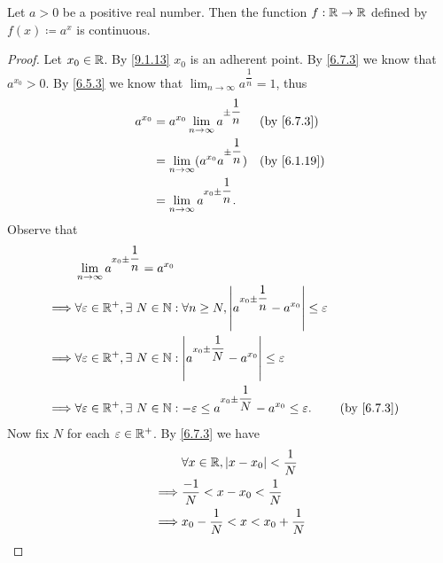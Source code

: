 \begin{prop}\label{9.4.10}
  Let \(a > 0\) be a positive real number.
  Then the function \(f : \mathbb{R} \to \mathbb{R}\) defined by \(f(x) \coloneqq a^x\) is continuous.
\end{prop}

\begin{proof}
  Let \(x_0 \in \mathbb{R}\).
  By \cref{9.1.13} \(x_0\) is an adherent point.
  By \cref{6.7.3} we know that \(a^{x_0} > 0\).
  By \cref{6.5.3} we know that \(\lim_{n \to \infty} a^{\dfrac{1}{n}} = 1\), thus
  \begin{align*}
    a^{x_0} & = a^{x_0} \lim_{n \to \infty} a^{\pm \dfrac{1}{n}}   &  & \text{(by \cref{6.7.3})}  \\
            & = \lim_{n \to \infty} (a^{x_0} a^{\pm \dfrac{1}{n}}) &  & \text{(by \cref{6.1.19})} \\
            & = \lim_{n \to \infty} a^{x_0 \pm \dfrac{1}{n}}.
  \end{align*}
  Observe that
  \begin{align*}
             & \lim_{n \to \infty} a^{x_0 \pm \dfrac{1}{n}} = a^{x_0}                                                                                                      \\
    \implies & \forall \varepsilon \in \R^+, \exists\ N \in \N : \forall n \geq N, \abs{a^{x_0 \pm \dfrac{1}{n}} - a^{x_0}} \leq \varepsilon                               \\
    \implies & \forall \varepsilon \in \R^+, \exists\ N \in \N : \abs{a^{x_0 \pm \dfrac{1}{N}} - a^{x_0}} \leq \varepsilon                                                 \\
    \implies & \forall \varepsilon \in \R^+, \exists\ N \in \N : -\varepsilon \leq a^{x_0 \pm \dfrac{1}{N}} - a^{x_0} \leq \varepsilon.      &  & \text{(by \cref{6.7.3})}
  \end{align*}
  Now fix \(N\) for each \(\varepsilon \in \mathbb{R}^+\).
  By \cref{6.7.3} we have
  \begin{align*}
             & \forall x \in \R, \abs{x - x_0} < \dfrac{1}{N}                                                                                                             \\
    \implies & \dfrac{-1}{N} < x - x_0 < \dfrac{1}{N}                                                                                                                     \\
    \implies & x_0 - \dfrac{1}{N} < x < x_0 + \dfrac{1}{N}                                                                                                                \\

\end{align*}
\end{proof}
